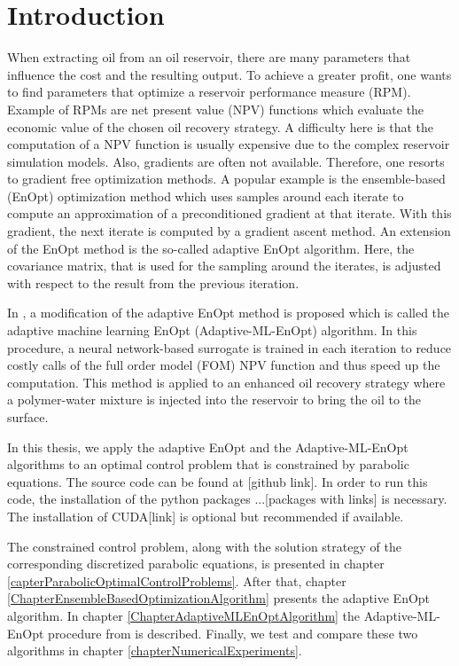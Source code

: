 \chapter{Introduction}

When extracting oil from an oil reservoir, there are many parameters that influence the cost and the resulting output. To achieve a greater profit, one wants to find parameters that optimize a reservoir performance measure (RPM). Example of RPMs are net present value (NPV) functions which evaluate the economic value of the chosen oil recovery strategy. A difficulty here is that the computation of a NPV function is usually expensive due to the complex reservoir simulation models. Also, gradients are often not available. Therefore, one resorts to gradient free optimization methods. A popular example is the ensemble-based (EnOpt) optimization method which uses samples around each iterate to compute an approximation of a preconditioned gradient at that iterate. With this gradient, the next iterate is computed by a gradient ascent method. An extension of the EnOpt method is the so-called adaptive EnOpt algorithm. Here, the covariance matrix, that is used for the sampling around the iterates, is adjusted with respect to the result from the previous iteration.

In \cite{Keil2022-dj}, a modification of the adaptive EnOpt method is proposed which is called the adaptive machine learning EnOpt (Adaptive-ML-EnOpt) algorithm. In this procedure, a neural network-based surrogate is trained in each iteration to reduce costly calls of the full order model (FOM) NPV function and thus speed up the computation. This method is applied to an enhanced oil recovery strategy where a polymer-water mixture is injected into the reservoir to bring the oil to the surface.

In this thesis, we apply the adaptive EnOpt and the Adaptive-ML-EnOpt algorithms to an optimal control problem that is constrained by parabolic equations. The source code can be found at [github link]. In order to run this code, the installation of the python packages ...[packages with links] is necessary. The installation of CUDA[link] is optional but recommended if available.

The constrained control problem, along with the solution strategy of the corresponding discretized parabolic equations, is presented in chapter \ref{capterParabolicOptimalControlProblems}. After that, chapter \ref{ChapterEnsembleBasedOptimizationAlgorithm} presents the adaptive EnOpt algorithm. In chapter \ref{ChapterAdaptiveMLEnOptAlgorithm} the Adaptive-ML-EnOpt procedure from \cite{Keil2022-dj} is described. Finally, we test and compare these two algorithms in chapter \ref{chapterNumericalExperiments}.
